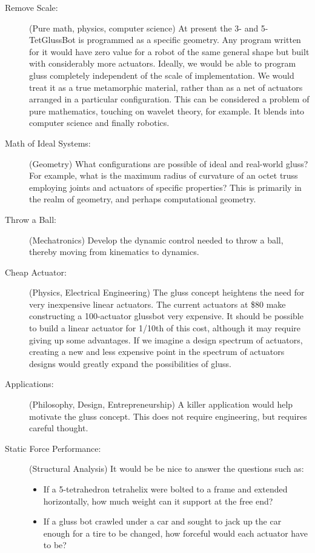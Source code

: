 \documentclass[11pt]{article}
\begin{document}
\begin{description}
\item [Remove Scale:] (Pure math, physics, computer science) At present the 3- and 5-TetGlussBot is programmed
  as a specific geometry. Any program
  written for it would have zero value for a robot of the same general shape but built with considerably
  more actuators. Ideally, we would be able to program gluss completely independent of the scale
  of implementation. We would treat it as a true metamorphic material, rather than as a net of
  actuators arranged in a particular configuration. This can be considered a problem of pure
  mathematics, touching on wavelet theory, for example. It blends into computer science and
  finally robotics.
\item [Math of Ideal Systems:] (Geometry) What configurations are possible of ideal and real-world gluss?
  For example, what is the maximum radius of curvature of an octet truss employing joints
  and actuators of specific properties? This is primarily in the realm of geometry, and perhaps
  computational geometry.
\item [Throw a Ball:] (Mechatronics) Develop the dynamic control needed to throw a ball, thereby moving from
  kinematics to dynamics.
\item [Cheap Actuator:] (Physics, Electrical Engineering) The gluss concept heightens the need for very inexpensive linear
  actuators. The current actuators at \$80 make constructing a 100-actuator glussbot very expensive.
  It should be possible to build a linear actuator for 1/10th of this cost, although it may require
  giving up some advantages. If we imagine a design spectrum of actuators, creating a new and
  less expensive point in the spectrum of actuators designs would greatly
  expand the possibilities of gluss.
\item [Applications:] (Philosophy, Design, Entrepreneurship) A killer application would help motivate the gluss concept. This does not
  require engineering, but requires careful thought.
\item [Static Force Performance:] (Structural Analysis)
It would be be nice to answer the questions such as:
\begin{itemize}  
\item If a 5-tetrahedron tetrahelix were bolted to a frame and extended horizontally, how much
  weight can it support at the free end?
\item If a gluss bot crawled under a car and sought to jack up the car enough for a tire
  to be changed, how forceful would each actuator have to be?

\end{itemize}
\end{description}
\end{document}
